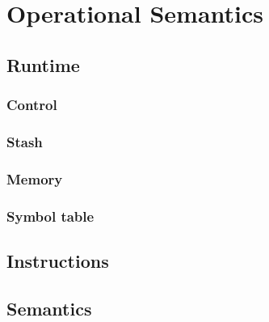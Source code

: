 \newpage
\section{Operational Semantics}\label{sec:opsem}

\subsection{Runtime}
\subsubsection{Control}
\subsubsection{Stash}
\subsubsection{Memory}
\subsubsection{Symbol table}

\subsection{Instructions}
\subsection{Semantics}